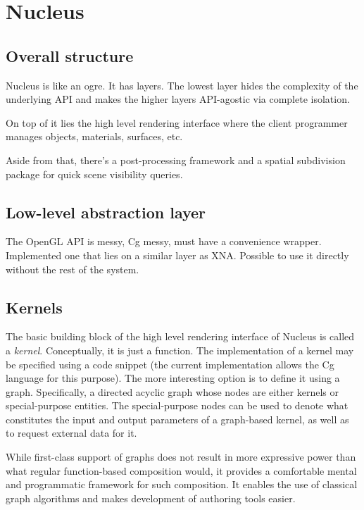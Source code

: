 
\chapter{ Nucleus }
\label{Chapter4}

\section{Overall structure}

Nucleus is like an ogre. It has layers. The lowest layer hides the complexity of the underlying API and makes the higher layers API-agostic via complete isolation.

On top of it lies the high level rendering interface where the client programmer manages objects, materials, surfaces, etc.

Aside from that, there's a post-processing framework and a spatial subdivision package for quick scene visibility queries.

\section{Low-level abstraction layer}

The OpenGL API is messy, Cg messy, must have a convenience wrapper. Implemented one that lies on a similar layer as XNA. Possible to use it directly without the rest of the system.

\section{Kernels}

The basic building block of the high level rendering interface of Nucleus is called a \emph{kernel}. Conceptually, it is just a function. The implementation of a kernel may be specified using a code snippet (the current implementation allows the Cg language for this purpose). The more interesting option is to define it using a graph. Specifically, a directed acyclic graph whose nodes are either kernels or special-purpose entities. The special-purpose nodes can be used to denote what constitutes the input and output parameters of a graph-based kernel, as well as to request external data for it.

While first-class support of graphs does not result in more expressive power than what regular function-based composition would, it provides a comfortable mental and programmatic framework for such composition. It enables the use of classical graph algorithms and makes development of authoring tools easier.

